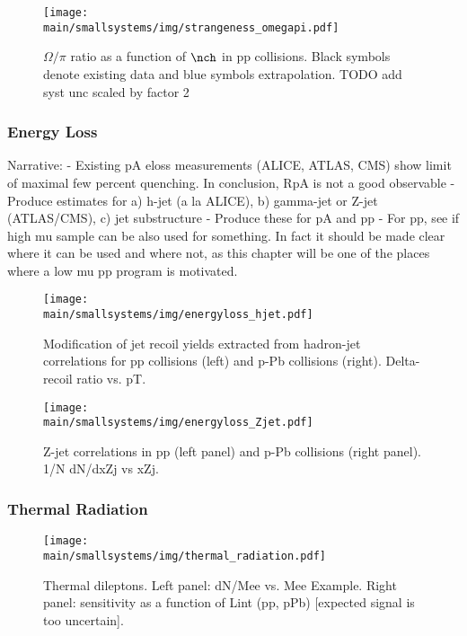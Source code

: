 \documentclass[../report.tex]{subfiles}
\providecommand{\main}{..}
\begin{document}
\begin{figure}[ht]
\centering
\texttt{[image: \\main/smallsystems/img/strangeness\_omegapi.pdf]}

\caption{$\Omega/\pi$ ratio as a function of $\nch$ in pp collisions. Black symbols denote existing data \cite{ALICE:2017jyt} and blue symbols extrapolation. TODO add syst unc scaled by factor 2}
\label{fig:smallsystems_strangeness_omega_pi}
\end{figure}

\subsubsection{Energy Loss}

Narrative: 
- Existing pA eloss measurements (ALICE, ATLAS, CMS) show limit of maximal few percent quenching. In conclusion, RpA is not a good observable
- Produce estimates for a) h-jet (a la ALICE), b) gamma-jet or Z-jet (ATLAS/CMS), c) jet substructure
- Produce these for pA and pp
- For pp, see if high mu sample can be also used for something. In fact it should be made clear where it can be used and where not, as this chapter will be one of the places where a low mu pp program is motivated.

\begin{figure}[ht]
\centering
\texttt{[image: \\main/smallsystems/img/energyloss\_hjet.pdf]}
\caption{Modification of jet recoil yields extracted from hadron-jet correlations for pp collisions (left) and p-Pb collisions (right). Delta-recoil ratio vs. pT.}
\label{fig:smallsystems_energyloss_hjet}
\end{figure}

\begin{figure}[ht]
\centering
\texttt{[image: \\main/smallsystems/img/energyloss\_Zjet.pdf]}

\caption{Z-jet correlations in pp (left panel) and p-Pb collisions (right panel). 1/N dN/dxZj vs xZj.}
\label{fig:smallsystems_energyloss_Zjet}
\end{figure}

\subsubsection{Thermal Radiation}

\begin{figure}[ht]
\centering
\texttt{[image: \\main/smallsystems/img/thermal\_radiation.pdf]}
\caption{Thermal dileptons. Left panel: dN/Mee vs. Mee Example. Right panel: sensitivity as a function of Lint (pp, pPb) [expected signal is too uncertain].}
\label{fig:smallsystems_thermal_radition}
\end{figure}
\end{document}
